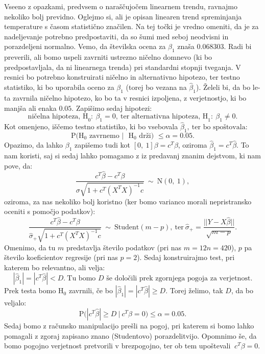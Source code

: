 \documentclass{article}
\begin{document}
Vseeno z opazkami, predvsem o naraščujočem linearnem trendu, ravnajmo nekoliko bolj previdno. 
Oglejmo si, ali je opisan linearen trend spreminjanja temperature s časom statistično značilen. 
\newline
Na tej točki je vredno omeniti, da je za nadeljevanje potrebno predpostaviti, da so šumi med seboj neodvisni in porazdeljeni normalno.
Vemo, da številska ocena za $\beta_{1}$ znaša $0.068303$. 
Radi bi preverili, ali bomo uspeli zavrniti ustrezno ničelno domnevo (ki bo predpostavljala, da ni linearnega trenda) pri standardni stopnji tveganja. 
V resnici bo potrebno konstruirati ničelno in alternativno hipotezo, ter testno statistiko, ki bo uporabila oceno za $\beta_1$ (torej bo vezana na $\hat{\beta}_1$). Želeli bi, da bo le-ta zavrnila ničelno hipotezo, ko bo ta v resnici izpoljena, z verjetnostjo, ki bo manjša ali enaka $0.05$. 
\newline
Zapišimo sedaj hipotezi:
$$
\text{ničelna hipoteza, H}_0:~\beta_1 = 0,~\text{ter alternativna hipoteza, H}_1:~\beta_1 \neq 0.
$$
Kot omenjeno, iščemo testno statistiko, ki bo vsebovala $\hat{\beta}_1,~\text{ter bo spoštovala:}$
$$
\text{P($\text{H}_0$ zavrnemo $|$ $\text{H}_0$ drži) $\leq \alpha = 0.05$}. 
$$
Opazimo, da lahko $\beta_1$ zapišemo tudi kot $[0,~1]\beta = c^T\beta$, oziroma $\hat{\beta}_1 = c^T\hat{\beta}$.
To nam koristi, saj si sedaj lahko pomagamo z iz predavanj znanim dejstvom, ki nam pove, da:
$$
    \frac{c^T\hat{\beta} - c^T \beta}{\sigma\sqrt{1 + c^T(X^TX)^{-1}c}}~\sim~\text{N}(0,~1), 
$$
oziroma, za nas nekoliko bolj koristno (ker bomo varianco morali nepristransko oceniti s pomočjo podatkov):
$$
\frac{c^T\hat{\beta} - c^T \beta}{\hat{\sigma}_{+}\sqrt{1 + c^T(X^TX)^{-1}c}}~\sim~\text{Student}(m - p),~\text{ter}~ \hat{\sigma}_{+} = \frac{||Y - X\hat{\beta}||}{\sqrt{m - p}}.
$$
Omenimo, da tu $m$ predstavlja število podatkov (pri nas $m = 12n = 420$), $p$ pa število koeficientov regresije (pri nas $p = 2$).
Sedaj konstruirajmo test, pri katerem bo relevantno, ali velja:
$$
    |\hat{\beta}_1| = |c^T\hat{\beta}| < D.~\text{Tu bomo $D$ še določili prek zgornjega pogoja za verjetnost}.
$$
Prek testa bomo $\text{H}_0$ zavrnili, če bo $|\hat{\beta}_1| = |c^T\hat{\beta}| \geq D$. Torej želimo, tak $D$, da bo veljalo:
$$
\text{P$(|c^T\hat{\beta}|$} \geq D~|~c^T\beta = 0)\leq \alpha = 0.05. 
$$
Sedaj bomo z računsko manipulacijo prešli na pogoj, pri katerem si bomo lahko pomagali z zgoraj zapisano znano (Studentovo) porazdelitvijo. 
Opomnimo še, da bomo pogojno verjetnost pretvorili v brezpogojno, ter ob tem upoštevali $~c^T\beta = 0$.
\end{document}
